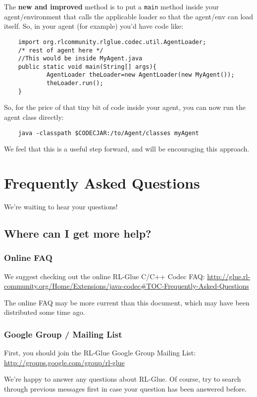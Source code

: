 \documentclass[11pt]{article}
\begin{document}
The \textbf{new and improved} method is to put a \texttt{main} method inside your agent/environment that calls the applicable loader so that the agent/env can load itself.  So, in your agent (for example) you'd have code like:
\begin{verbatim}
	import org.rlcommunity.rlglue.codec.util.AgentLoader;
	/* rest of agent here */
	//This would be inside MyAgent.java
	public static void main(String[] args){
	        AgentLoader theLoader=new AgentLoader(new MyAgent());
	        theLoader.run();
	}
\end{verbatim}

So, for the price of that tiny bit of code inside your agent, you can now run the agent class directly:
\begin{verbatim}
	java -classpath $CODECJAR:/to/Agent/classes myAgent
\end{verbatim}

We feel that this is a useful step forward, and will be encouraging this approach.

\section{Frequently Asked Questions}
We're waiting to hear your questions!

\subsection{Where can I get more help?}
\subsubsection{Online FAQ}
We suggest checking out the online RL-Glue C/C++ Codec FAQ:\newline
\url{http://glue.rl-community.org/Home/Extensions/java-codec#TOC-Frequently-Asked-Questions}

The online FAQ may be more current than this document, which may have been distributed some time ago.

\subsubsection{Google Group / Mailing List}
First, you should join the RL-Glue Google Group Mailing List:\newline
\url{http://groups.google.com/group/rl-glue}

We're happy to answer any questions about RL-Glue.  Of course, try to search through previous messages first in case your question has been answered before.
\end{document}
